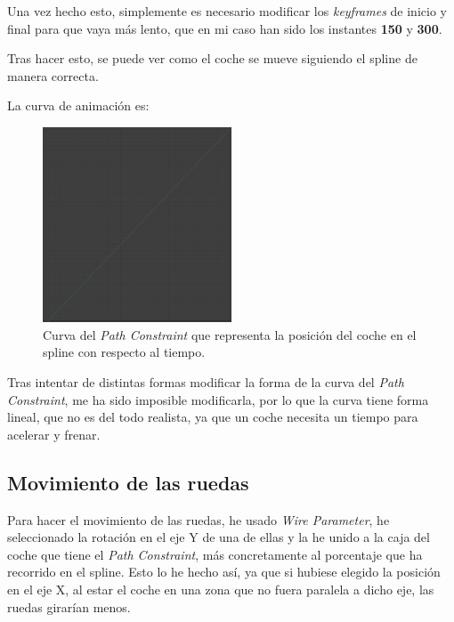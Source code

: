 \bigskip

Una vez hecho esto, simplemente es necesario modificar los \textit{keyframes} de inicio y final para que vaya más lento, que en mi caso han sido los instantes \textbf{150} y \textbf{300}.

\bigskip

Tras hacer esto, se puede ver como el coche se mueve siguiendo el spline de manera correcta.

\bigskip

La curva de animación es:

\begin{figure}[H]
    \centering
   \includegraphics[width=0.5\textwidth]{imagenes/coche/pathConstraint.png}
   \caption{Curva del \textit{Path Constraint} que representa la posición del coche en el spline con respecto al tiempo.}
\end{figure}

Tras intentar de distintas formas modificar la forma de la curva del \textit{Path Constraint}, me ha sido imposible modificarla, por lo que la curva tiene forma lineal, que no es del todo realista, ya que un coche necesita un tiempo para acelerar y frenar.

\subsection{Movimiento de las ruedas}

Para hacer el movimiento de las ruedas, he usado \textit{Wire Parameter}, he seleccionado la rotación en el eje Y de una de ellas y la he unido a la caja del coche que tiene el \textit{Path Constraint}, más concretamente al porcentaje que ha recorrido en el spline. Esto lo he hecho así, ya que si hubiese elegido la posición en el eje X, al estar el coche en una zona que no fuera paralela a dicho eje, las ruedas girarían menos.


